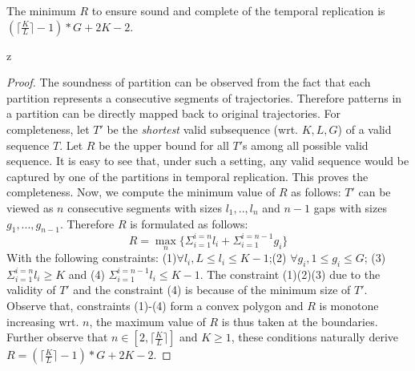 \begin{theorem}
\label{thm:replication_partition}
The minimum $R$ to ensure sound and complete of the temporal replication 
is $(\lceil \frac{K}{L} \rceil -1)*G+2K -2$.
\end{theorem}z
\begin{proof}
The soundness of partition can be observed from the fact 
that each partition represents a consecutive segments of trajectories. 
Therefore patterns in a partition can be directly mapped 
back to original trajectories. 
For completeness, let $T'$ be the \emph{shortest} valid subsequence (wrt. $K,L,G$) 
of a valid sequence $T$. Let $R$ be the upper bound for all $T'$s among 
all possible valid sequence. It is easy to see that, under such a setting,
any valid sequence would be captured by one of the partitions in temporal
replication. This proves the completeness. Now, we compute the minimum value
of $R$ as follows:
$T'$ can be viewed as $n$ consecutive segments with sizes $l_1,..,l_n$
and $n-1$ gaps with sizes $g_1,...,g_{n-1}$. Therefore $R$ is formulated 
as follows:
\begin{equation}
R = \max_{n} \{ \Sigma_{i=1}^{i=n} l_i + \Sigma_{i=1}^{i=n-1} g_i \}
\end{equation}
With the following constraints: (1)$\forall l_i, L \leq l_i \leq K-1$;(2)
$\forall g_i, 1 \leq g_i \leq G$; (3) $\Sigma_{i=1}^{i=n} l_i \geq K$ and
(4) $\Sigma_{i=1}^{i=n-1}l_i  \leq K-1$. The constraint (1)(2)(3) due to the 
validity of $T'$ and the constraint (4) is because of the minimum size of $T'$.
Observe that, constraints (1)-(4) form a convex polygon and $R$ is monotone
increasing wrt. $n$, the maximum value of $R$ is thus taken at the boundaries. Further
observe that $n \in [2, \lceil \frac{K}{L} \rceil]$ and $K \geq 1$, these
conditions naturally derive
$R = (\lceil \frac{K}{L} \rceil -1)*G+2K -2$.
\end{proof}

